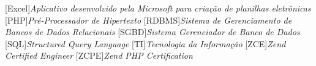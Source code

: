 
[Excel]{\textit{Aplicativo desenvolvido pela Microsoft para
criação de planilhas eletrônicas}}
[PHP]{\textit{Pré-Processador de Hipertexto}}
[RDBMS]{\textit{Sistema de Gerenciamento de Bancos de Dados
Relacionais}}
[SGBD]{\textit{Sistema Gerenciador de Banco de Dados}}
[SQL]{\textit{Structured Query Language}}
[TI]{\textit{Tecnologia da Informação}}
[ZCE]{\textit{Zend Certified Engineer}}
[ZCPE]{\textit{Zend PHP Certification}}